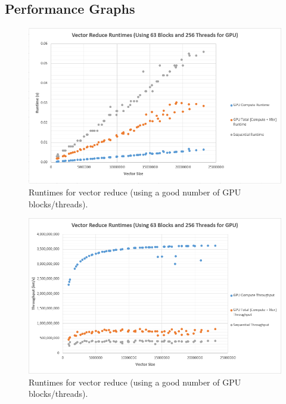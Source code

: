 \documentclass{article}
\begin{document}
\subsection{Performance Graphs}
  \begin{figure}[h]
    \centering
    \includegraphics[width=.9\linewidth]{runtime_scatter}
    \caption{Runtimes for vector reduce (using a good number of GPU blocks/threads).}
    \label{fig:runtime_scatter}
  \end{figure}


  \begin{figure}[h]
    \centering
    \includegraphics[width=.9\linewidth]{throughput_scatter}
    \caption{Runtimes for vector reduce (using a good number of GPU blocks/threads).}
    \label{fig:throughput_scatter}
  \end{figure}
\end{document}

